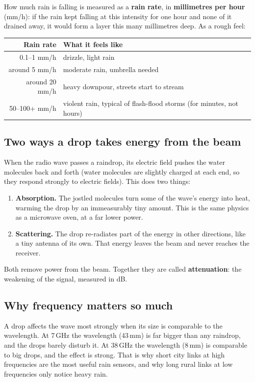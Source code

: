\documentclass[11pt,a4paper]{article}
\begin{document}
How much rain is falling is measured as a \textbf{rain rate}, in \textbf{millimetres per hour}
(mm/h): if the rain kept falling at this intensity for one hour and none of it drained away, it
would form a layer this many millimetres deep. As a rough feel:
\begin{center}\small
\begin{tabular}{rl}
\toprule
Rain rate & What it feels like \\
\midrule
0.1--1 mm/h & drizzle, light rain \\
around 5 mm/h & moderate rain, umbrella needed \\
around 20 mm/h & heavy downpour, streets start to stream \\
50--100+ mm/h & violent rain, typical of flash-flood storms (for minutes, not hours) \\
\bottomrule
\end{tabular}
\end{center}

\subsection{Two ways a drop takes energy from the beam}

When the radio wave passes a raindrop, its electric field pushes the water molecules back and forth
(water molecules are slightly charged at each end, so they respond strongly to electric fields).
This does two things:
\begin{enumerate}
\item \textbf{Absorption.} The jostled molecules turn some of the wave's energy into heat, warming the drop
by an immeasurably tiny amount. This is the same physics as a microwave oven, at a far lower power.
\item \textbf{Scattering.} The drop re-radiates part of the energy in other directions, like a tiny
antenna of its own. That energy leaves the beam and never reaches the receiver.
\end{enumerate}
Both remove power from the beam. Together they are called \textbf{attenuation}: the weakening of the
signal, measured in dB.

\subsection{Why frequency matters so much}

A drop affects the wave most strongly when its size is comparable to the wavelength. At 7\,GHz the
wavelength (43\,mm) is far bigger than any raindrop, and the drops barely disturb it. At 38\,GHz the
wavelength (8\,mm) is comparable to big drops, and the effect is strong. That is why short city
links at high frequencies are the most useful rain sensors, and why long rural links at low
frequencies only notice heavy rain.
\end{document}
